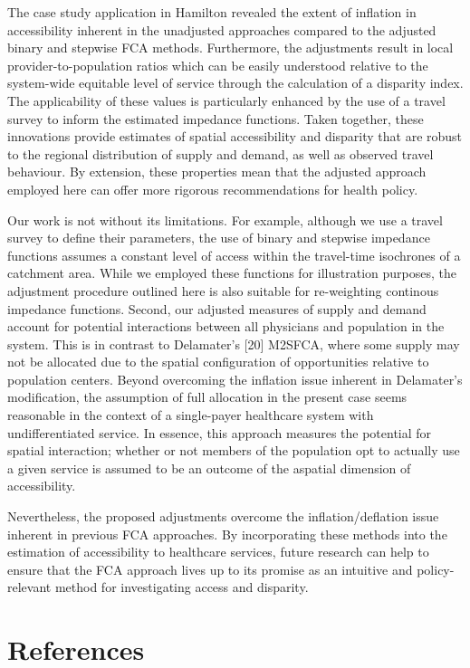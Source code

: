 \documentclass[10pt,letterpaper]{article}
\begin{document}
The case study application in Hamilton revealed the extent of inflation
in accessibility inherent in the unadjusted approaches compared to the
adjusted binary and stepwise FCA methods. Furthermore, the adjustments
result in local provider-to-population ratios which can be easily
understood relative to the system-wide equitable level of service
through the calculation of a disparity index. The applicability of these
values is particularly enhanced by the use of a travel survey to inform
the estimated impedance functions. Taken together, these innovations
provide estimates of spatial accessibility and disparity that are robust
to the regional distribution of supply and demand, as well as observed
travel behaviour. By extension, these properties mean that the adjusted
approach employed here can offer more rigorous recommendations for
health policy.

Our work is not without its limitations. For example, although we use a
travel survey to define their parameters, the use of binary and stepwise
impedance functions assumes a constant level of access within the
travel-time isochrones of a catchment area. While we employed these
functions for illustration purposes, the adjustment procedure outlined
here is also suitable for re-weighting continous impedance functions.
Second, our adjusted measures of supply and demand account for potential
interactions between all physicians and population in the system. This
is in contrast to Delamater's {[}20{]} M2SFCA, where some supply may not
be allocated due to the spatial configuration of opportunities relative
to population centers. Beyond overcoming the inflation issue inherent in
Delamater's modification, the assumption of full allocation in the
present case seems reasonable in the context of a single-payer
healthcare system with undifferentiated service. In essence, this
approach measures the potential for spatial interaction; whether or not
members of the population opt to actually use a given service is assumed
to be an outcome of the aspatial dimension of accessibility.

Nevertheless, the proposed adjustments overcome the inflation/deflation
issue inherent in previous FCA approaches. By incorporating these
methods into the estimation of accessibility to healthcare services,
future research can help to ensure that the FCA approach lives up to its
promise as an intuitive and policy-relevant method for investigating
access and disparity.

\section*{References}\label{references}
\end{document}
